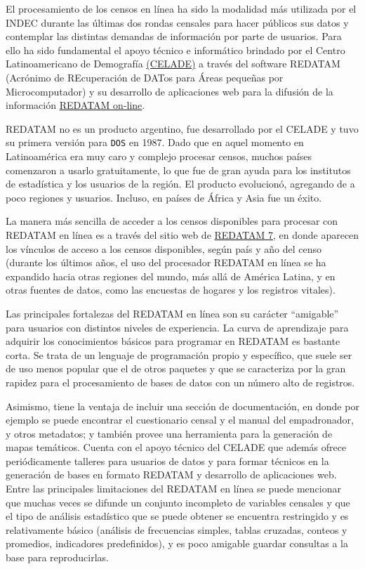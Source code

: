 \documentclass[
]{article}
\begin{document}
El procesamiento de los censos en línea ha sido la modalidad más utilizada por el INDEC durante las últimas dos rondas censales para hacer públicos sus datos y contemplar las distintas demandas de información por parte de usuarios. Para ello ha sido fundamental el apoyo técnico e informático brindado por el Centro Latinoamericano de Demografía \href{https://www.cepal.org/es/equipo/centro-latinoamericano-caribeno-demografia-celade}{(CELADE)} a través del software REDATAM (Acrónimo de REcuperación de DATos para Áreas pequeñas por Microcomputador) y su desarrollo de aplicaciones web para la difusión de la información \href{https://redatam.org/es}{REDATAM on-line}.

REDATAM no es un producto argentino, fue desarrollado por el CELADE y tuvo su primera versión para \texttt{DOS} en 1987. Dado que en aquel momento en Latinoamérica era muy caro y complejo procesar censos, muchos países comenzaron a usarlo gratuitamente, lo que fue de gran ayuda para los institutos de estadística y los usuarios de la región. El producto evolucionó, agregando de a poco regiones y usuarios. Incluso, en países de África y Asia fue un éxito.

La manera más sencilla de acceder a los censos disponibles para procesar con REDATAM en línea es a través del sitio web de \href{https://www.cepal.org/es/temas/redatam/download-redatam}{REDATAM 7}, en donde aparecen los vínculos de acceso a los censos disponibles, según país y año del censo (durante los últimos años, el uso del procesador REDATAM en línea se ha expandido hacia otras regiones del mundo, más allá de América Latina, y en otras fuentes de datos, como las encuestas de hogares y los registros vitales).

Las principales fortalezas del REDATAM en línea son su carácter ``amigable'' para usuarios con distintos niveles de experiencia. La curva de aprendizaje para adquirir los conocimientos básicos para programar en REDATAM es bastante corta. Se trata de un lenguaje de programación propio y específico, que suele ser de uso menos popular que el de otros paquetes y que se caracteriza por la gran rapidez para el procesamiento de bases de datos con un número alto de registros.

Asimismo, tiene la ventaja de incluir una sección de documentación, en donde por ejemplo se puede encontrar el cuestionario censal y el manual del empadronador, y otros metadatos; y también provee una herramienta para la generación de mapas temáticos. Cuenta con el apoyo técnico del CELADE que además ofrece periódicamente talleres para usuarios de datos y para formar técnicos en la generación de bases en formato REDATAM y desarrollo de aplicaciones web. Entre las principales limitaciones del REDATAM en línea se puede mencionar que muchas veces se difunde un conjunto incompleto de variables censales y que el tipo de análisis estadístico que se puede obtener se encuentra restringido y es relativamente básico (análisis de frecuencias simples, tablas cruzadas, conteos y promedios, indicadores predefinidos), y es poco amigable guardar consultas a la base para reproducirlas.
\end{document}
